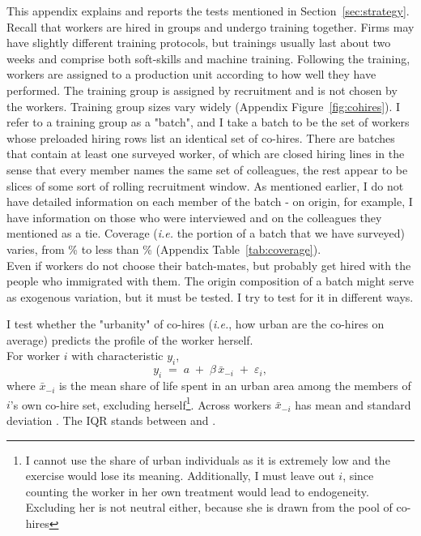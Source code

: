 \noindent This appendix explains and reports the tests mentioned in Section~\ref{sec:strategy}.\\

\noindent Recall that workers are hired in groups and undergo training together. Firms may have slightly different training protocols, but trainings usually last about two weeks and comprise both soft-skills and machine training. Following the training, workers are assigned to a production unit according to how well they have performed. The training group is assigned by recruitment and is not chosen by the workers. Training group sizes vary widely (Appendix Figure~\ref{fig:cohires}). I refer to a training group as a "batch", and I take a batch to be the set of workers whose preloaded hiring rows list an identical set of co-hires. There are \pnBatchesWord{} batches that contain at least one surveyed worker, of which \pnBatchesLine{} are closed hiring lines in the sense that every member names the same set of colleagues, the rest appear to be slices of some sort of rolling recruitment window. As mentioned earlier, I do not have detailed information on each member of the batch - on origin, for example, I have information on those who were interviewed and on the colleagues they mentioned as a tie. Coverage (\textit{i.e.} the portion of a batch that we have surveyed) varies, from \pnCoverageMaxPct{}\% to less than \pnCoverageMinPct{}\% (Appendix Table~\ref{tab:coverage}). \\

\noindent Even if workers do not choose their batch-mates, but probably get hired with the people who immigrated with them. The origin composition of a batch might serve as exogenous variation, but it must be tested. I try to test for it in different ways. \\


\noindent I test whether the "urbanity" of co-hires (\textit{i.e.}, how urban are the co-hires on average) predicts the profile of the worker herself. \\

\noindent For worker $i$ with characteristic $y_i$,
\begin{equation}
\label{eq:setting-balance}
y_i \;=\; a \;+\; \beta \, \bar{x}_{-i} \;+\; \varepsilon_i ,
\end{equation}
where $\bar{x}_{-i}$ is the mean share of life spent in an urban area among the members of $i$'s own co-hire set, excluding herself\footnote{I cannot use the share of urban individuals as it is extremely low and the exercise would lose its meaning. Additionally, I must leave out $i$, since counting the worker in her own treatment would lead to endogeneity. Excluding her is not neutral either, because she is drawn from the pool of co-hires}. Across workers $\bar{x}_{-i}$ has mean \pnTreatMean{} and standard deviation \pnTreatSd{}. The IQR stands between \pnTreatPTwentyFive{} and \pnTreatPSeventyFive{}. \\



